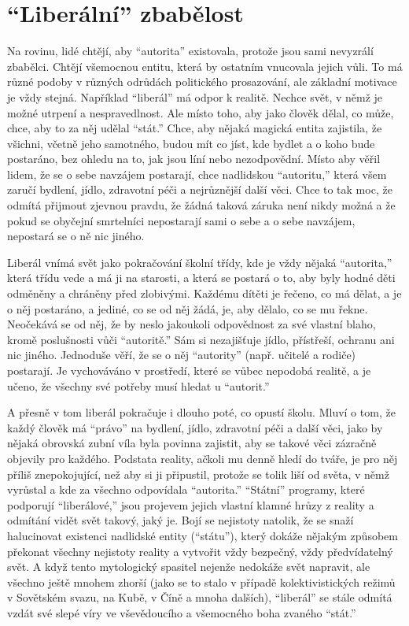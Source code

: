 \documentclass{book}
\begin{document}
\section{\enquote{Liberální} zbabělost}

Na rovinu, lidé chtějí, aby \enquote{autorita} existovala, protože jsou sami nevyzrálí zbabělci. Chtějí všemocnou entitu, která by ostatním vnucovala jejich vůli. To má různé podoby v různých odrůdách politického prosazování, ale základní motivace je vždy stejná. Například \enquote{liberál} má odpor k realitě. Nechce svět, v němž je možné utrpení a nespravedlnost. Ale místo toho, aby jako člověk dělal, co může, chce, aby to za něj udělal \enquote{stát.} Chce, aby nějaká magická entita zajistila, že všichni, včetně jeho samotného, budou mít co jíst, kde bydlet a o koho bude postaráno, bez ohledu na to, jak jsou líní nebo nezodpovědní. Místo aby věřil lidem, že se o sebe navzájem postarají, chce nadlidskou \enquote{autoritu,} která všem zaručí bydlení, jídlo, zdravotní péči a nejrůznější další věci. Chce to tak moc, že odmítá přijmout zjevnou pravdu, že žádná taková záruka není nikdy možná a že pokud se obyčejní smrtelníci nepostarají sami o sebe a o sebe navzájem, nepostará se o ně nic jiného.

Liberál vnímá svět jako pokračování školní třídy, kde je vždy nějaká \enquote{autorita,} která třídu vede a má ji na starosti, a která se postará o to, aby byly hodné děti odměněny a chráněny před zlobivými. Každému dítěti je řečeno, co má dělat, a je o něj postaráno, a jediné, co se od něj žádá, je, aby dělalo, co se mu řekne. Neočekává se od něj, že by neslo jakoukoli odpovědnost za své vlastní blaho, kromě poslušnosti vůči \enquote{autoritě.} Sám si nezajišťuje jídlo, přístřeší, ochranu ani nic jiného. Jednoduše věří, že se o něj \enquote{autority} (např. učitelé a rodiče) postarají. Je vychováváno v prostředí, které se vůbec nepodobá realitě, a je učeno, že všechny své potřeby musí hledat u \enquote{autorit.}

A přesně v tom liberál pokračuje i dlouho poté, co opustí školu. Mluví o tom, že každý člověk má \enquote{právo} na bydlení, jídlo, zdravotní péči a další věci, jako by nějaká obrovská zubní víla byla povinna zajistit, aby se takové věci zázračně objevily pro každého. Podstata reality, ačkoli mu denně hledí do tváře, je pro něj příliš znepokojující, než aby si ji připustil, protože se tolik liší od světa, v němž vyrůstal a kde za všechno odpovídala \enquote{autorita.} \enquote{Státní} programy, které podporují \enquote{liberálové,} jsou projevem jejich vlastní klamné hrůzy z reality a odmítání vidět svět takový, jaký je. Bojí se nejistoty natolik, že se snaží halucinovat existenci nadlidské entity (\enquote{státu}), který dokáže nějakým způsobem překonat všechny nejistoty reality a vytvořit vždy bezpečný, vždy předvídatelný svět. A když tento mytologický spasitel nejenže nedokáže svět napravit, ale všechno ještě mnohem zhorší (jako se to stalo v případě kolektivistických režimů v Sovětském svazu, na Kubě, v Číně a mnoha dalších), \enquote{liberál} se stále odmítá vzdát své slepé víry ve vševědoucího a všemocného boha zvaného \enquote{stát.}
\end{document}
